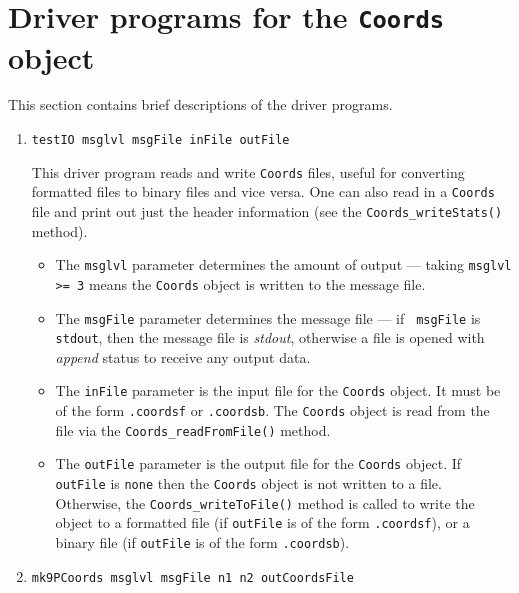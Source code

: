 \par
\section{Driver programs for the {\tt Coords} object}
\label{section:Coords:drivers}
\par
This section contains brief descriptions of the driver programs.
\par
\begin{enumerate}
\item
\begin{verbatim}
testIO msglvl msgFile inFile outFile
\end{verbatim}
This driver program reads and write {\tt Coords} files, useful for
converting formatted files to binary files and vice versa.
One can also read in a {\tt Coords} file and print out just the 
header information (see the {\tt Coords\_writeStats()} method).
\par
\begin{itemize}
\item
The {\tt msglvl} parameter determines the amount of output ---
taking {\tt msglvl >= 3} means the {\tt Coords} object is written
to the message file.
\item
The {\tt msgFile} parameter determines the message file --- if {\tt
msgFile} is {\tt stdout}, then the message file is {\it stdout},
otherwise a file is opened with {\it append} status to receive any
output data.
\item
The {\tt inFile} parameter is the input file for the {\tt Coords}
object. It must be of the form {\tt *.coordsf} or {\tt *.coordsb}.
The {\tt Coords} object is read from the file via the
{\tt Coords\_readFromFile()} method.
\item
The {\tt outFile} parameter is the output file for the {\tt Coords}
object. 
If {\tt outFile} is {\tt none} then the {\tt Coords} object is not
written to a file. 
Otherwise, the {\tt Coords\_writeToFile()} method is called to write
the object to 
a formatted file (if {\tt outFile} is of the form {\tt *.coordsf}),
or
a binary file (if {\tt outFile} is of the form {\tt *.coordsb}).
\end{itemize}
\item
\begin{verbatim}
mk9PCoords msglvl msgFile n1 n2 outCoordsFile

\end{verbatim}
\end{enumerate}
